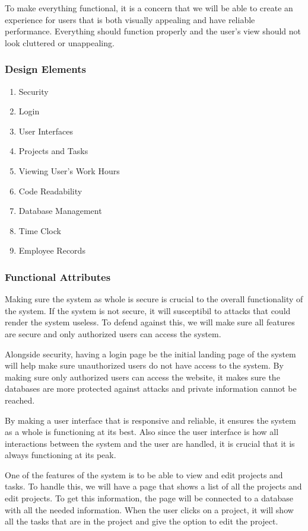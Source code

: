 \documentclass[letterpaper,10pt,titlepage,journal,compsoc,draftclsnofoot,onecolumn]{IEEEtran}
\begin{document}
To make everything functional, it is a concern that we will be able to create an experience for users that is both visually appealing and have reliable performance. Everything should function properly and the user’s view should not look cluttered or unappealing. 

\subsubsection{Design Elements}

\begin{enumerate}
\item{Security}
\item{Login}
\item{User Interfaces}
\item{Projects and Tasks}
\item{Viewing User's Work Hours}
\item{Code Readability}
\item{Database Management}
\item{Time Clock}
\item{Employee Records}
\end{enumerate}

\subsubsection{Functional Attributes}

Making sure the system as whole is secure is crucial to the overall functionality of the system. If the system is not secure, it will susceptibil to attacks that could render the system useless. To defend against this, we will make sure all features are secure and only authorized users can access the system.  


Alongside security, having a login page be the initial landing page of the system will help make sure unauthorized users do not have access to the system. By making sure only authorized users can access the website, it makes sure the databases are more protected against attacks and private information cannot be reached. 


By making a user interface that is responsive and reliable, it ensures the system as a whole is functioning at its best. Also since the user interface is how all interactions between the system and the user are handled, it is crucial that it is always functioning at its peak. 


One of the features of the system is to be able to view and edit projects and tasks. To handle this, we will have a page that shows a list of all the projects and edit projects. To get this information, the page will be connected to a database with all the needed information. When the user clicks on a project, it will show all the tasks that are in the project and give the option to edit the project. 
\end{document}

